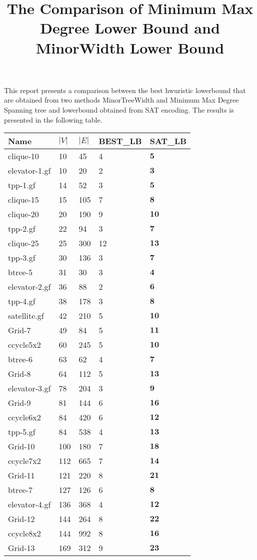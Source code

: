 \documentclass{article}
\title{The Comparison of Minimum Max Degree Lower Bound and MinorWidth Lower Bound}
\begin{document}
\maketitle
This report presents a comparison between the best hwuristic lowerbound that are obtained from two methods MinorTreeWidth and Minimum Max Degree Spanning tree and lowerbound obtained from SAT encoding. The results is presented in the following table.
\begin{longtable}{|l |l |l |l |l |}
\hline
Name&$|V|$&$|E|$&BEST\_LB&SAT\_LB\\
\hline
clique-10&10&45&4&$\mathbf{5}$\\
elevator-1.gf&10&20&2&$\mathbf{3}$\\
tpp-1.gf&14&52&3&$\mathbf{5}$\\
clique-15&15&105&7&$\mathbf{8}$\\
clique-20&20&190&9&$\mathbf{10}$\\
tpp-2.gf&22&94&3&$\mathbf{7}$\\
clique-25&25&300&12&$\mathbf{13}$\\
tpp-3.gf&30&136&3&$\mathbf{7}$\\
btree-5&31&30&3&$\mathbf{4}$\\
elevator-2.gf&36&88&2&$\mathbf{6}$\\
tpp-4.gf&38&178&3&$\mathbf{8}$\\
satellite.gf&42&210&5&$\mathbf{10}$\\
Grid-7&49&84&5&$\mathbf{11}$\\
ccycle5x2&60&245&5&$\mathbf{10}$\\
btree-6&63&62&4&$\mathbf{7}$\\
Grid-8&64&112&5&$\mathbf{13}$\\
elevator-3.gf&78&204&3&$\mathbf{9}$\\
Grid-9&81&144&6&$\mathbf{16}$\\
ccycle6x2&84&420&6&$\mathbf{12}$\\
tpp-5.gf&84&538&4&$\mathbf{13}$\\
Grid-10&100&180&7&$\mathbf{18}$\\
ccycle7x2&112&665&7&$\mathbf{14}$\\
Grid-11&121&220&8&$\mathbf{21}$\\
btree-7&127&126&6&$\mathbf{8}$\\
elevator-4.gf&136&368&4&$\mathbf{12}$\\
Grid-12&144&264&8&$\mathbf{22}$\\
ccycle8x2&144&992&8&$\mathbf{16}$\\
Grid-13&169&312&9&$\mathbf{23}$\\

\end{longtable}
\end{document}
